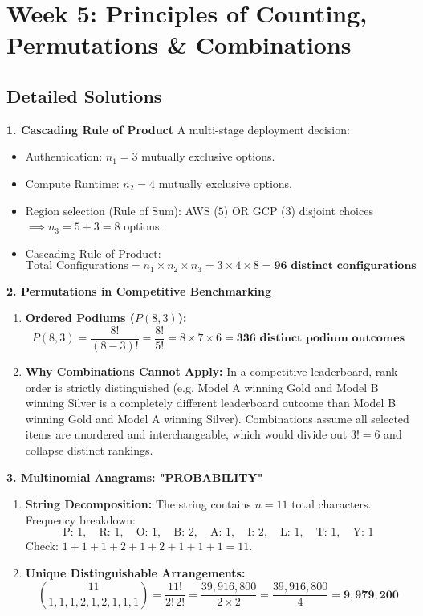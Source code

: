 \section*{Week 5: Principles of Counting, Permutations \& Combinations}

\subsection*{Detailed Solutions}

\textbf{1. Cascading Rule of Product}
A multi-stage deployment decision:
\begin{itemize}
    \item Authentication: $n_1 = 3$ mutually exclusive options.
    \item Compute Runtime: $n_2 = 4$ mutually exclusive options.
    \item Region selection (Rule of Sum): AWS ($5$) OR GCP ($3$) disjoint choices $\implies n_3 = 5 + 3 = 8$ options.
    \item Cascading Rule of Product:
    $$\text{Total Configurations} = n_1 \times n_2 \times n_3 = 3 \times 4 \times 8 = \mathbf{96 \text{ distinct configurations}}$$
\end{itemize}

\textbf{2. Permutations in Competitive Benchmarking}
\begin{enumerate}
    \item \textbf{Ordered Podiums ($P(8, 3)$):}
    $$P(8, 3) = \frac{8!}{(8 - 3)!} = \frac{8!}{5!} = 8 \times 7 \times 6 = \mathbf{336 \text{ distinct podium outcomes}}$$
    \item \textbf{Why Combinations Cannot Apply:} In a competitive leaderboard, rank order is strictly distinguished (e.g. Model A winning Gold and Model B winning Silver is a completely different leaderboard outcome than Model B winning Gold and Model A winning Silver). Combinations assume all selected items are unordered and interchangeable, which would divide out $3! = 6$ and collapse distinct rankings.
\end{enumerate}

\textbf{3. Multinomial Anagrams: "PROBABILITY"}
\begin{enumerate}
    \item \textbf{String Decomposition:} The string contains $n = 11$ total characters. Frequency breakdown:
    $$\text{P: 1}, \quad \text{R: 1}, \quad \text{O: 1}, \quad \text{B: 2}, \quad \text{A: 1}, \quad \text{I: 2}, \quad \text{L: 1}, \quad \text{T: 1}, \quad \text{Y: 1}$$
    Check: $1 + 1 + 1 + 2 + 1 + 2 + 1 + 1 + 1 = 11$.
    \item \textbf{Unique Distinguishable Arrangements:}
    $$\binom{11}{1, 1, 1, 2, 1, 2, 1, 1, 1} = \frac{11!}{2! \, 2!} = \frac{39{,}916{,}800}{2 \times 2} = \frac{39{,}916{,}800}{4} = \mathbf{9{,}979{,}200}$$
\end{enumerate}

